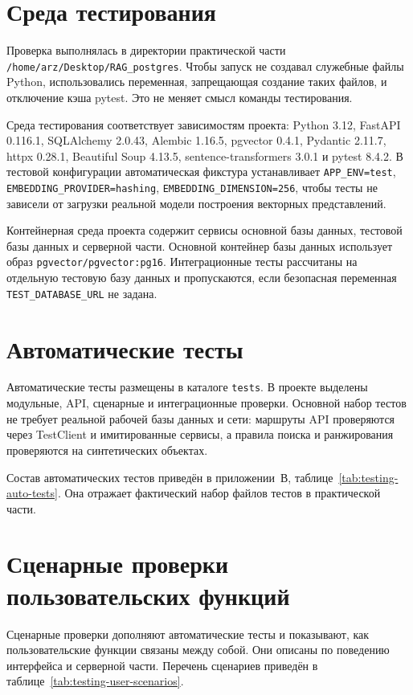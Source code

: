 \section{Среда тестирования}

Проверка выполнялась в директории практической части \texttt{/home/arz/Desktop/RAG\_postgres}. Чтобы запуск не создавал служебные файлы Python, использовались переменная, запрещающая создание таких файлов, и отключение кэша pytest. Это не меняет смысл команды тестирования.

Среда тестирования соответствует зависимостям проекта: Python 3.12, FastAPI 0.116.1, SQLAlchemy 2.0.43, Alembic 1.16.5, pgvector 0.4.1, Pydantic 2.11.7, httpx 0.28.1, Beautiful Soup 4.13.5, sentence-transformers 3.0.1 и pytest 8.4.2. В тестовой конфигурации автоматическая фикстура устанавливает \texttt{APP\_ENV=test}, \texttt{EMBEDDING\_PROVIDER=hashing}, \texttt{EMBEDDING\_DIMENSION=256}, чтобы тесты не зависели от загрузки реальной модели построения векторных представлений.

Контейнерная среда проекта содержит сервисы основной базы данных, тестовой базы данных и серверной части. Основной контейнер базы данных использует образ \texttt{pgvector/pgvector:pg16}. Интеграционные тесты рассчитаны на отдельную тестовую базу данных и пропускаются, если безопасная переменная \texttt{TEST\_DATABASE\_URL} не задана.

\section{Автоматические тесты}

Автоматические тесты размещены в каталоге \texttt{tests}. В проекте выделены модульные, API, сценарные и интеграционные проверки. Основной набор тестов не требует реальной рабочей базы данных и сети: маршруты API проверяются через TestClient и имитированные сервисы, а правила поиска и ранжирования проверяются на синтетических объектах.

Состав автоматических тестов приведён в приложении~В, таблице~\ref{tab:testing-auto-tests}. Она отражает фактический набор файлов тестов в практической части.

\section{Сценарные проверки пользовательских функций}

Сценарные проверки дополняют автоматические тесты и показывают, как пользовательские функции связаны между собой. Они описаны по поведению интерфейса и серверной части. Перечень сценариев приведён в таблице~\ref{tab:testing-user-scenarios}.

